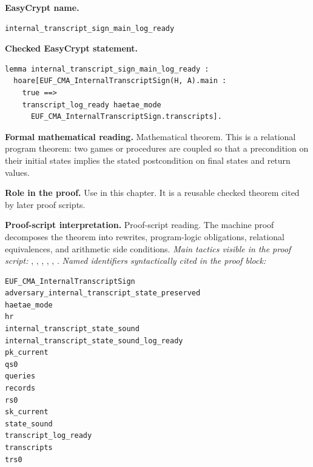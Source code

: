 \begin{formaltheorem}
\noindent\textbf{EasyCrypt name.}
\begin{lstlisting}[language=EasyCrypt,basicstyle=\ttfamily\scriptsize]
internal_transcript_sign_main_log_ready
\end{lstlisting}
\noindent\textbf{Checked EasyCrypt statement.}
\begin{lstlisting}[language=EasyCrypt,basicstyle=\ttfamily\scriptsize]
lemma internal_transcript_sign_main_log_ready :
  hoare[EUF_CMA_InternalTranscriptSign(H, A).main :
    true ==>
    transcript_log_ready haetae_mode
      EUF_CMA_InternalTranscriptSign.transcripts].
\end{lstlisting}
\noindent\textbf{Formal mathematical reading.}
Mathematical theorem. This is a relational program theorem: two games or procedures are coupled so that a precondition on their initial states implies the stated postcondition on final states and return values.

\noindent\textbf{Role in the proof.}
Use in this chapter. It is a reusable checked theorem cited by later proof scripts.

\noindent\textbf{Proof-script interpretation.}
Proof-script reading. The machine proof decomposes the theorem into rewrites, program-logic obligations, relational equivalences, and arithmetic side conditions.
\emph{Main tactics visible in the proof script:} , , , , , .
\emph{Named identifiers syntactically cited in the proof block:}
\begin{lstlisting}[language=EasyCrypt,basicstyle=\ttfamily\scriptsize]
EUF_CMA_InternalTranscriptSign
adversary_internal_transcript_state_preserved
haetae_mode
hr
internal_transcript_state_sound
internal_transcript_state_sound_log_ready
pk_current
qs0
queries
records
rs0
sk_current
state_sound
transcript_log_ready
transcripts
trs0
\end{lstlisting}

\end{formaltheorem}

